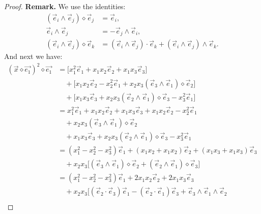 \documentclass[10pt,a4paper]{amsart}
\begin{document}
\begin{proof}
\textbf{Remark.} We use the identities:
\begin{align*}
\left( \vec{e}_{i} \wedge \vec{e}_{j} \right) \diamond \vec{e}_{j}
&= \vec{e}_{i}, \\[4pt]
\vec{e}_{i} \wedge \vec{e}_{j}
&= - \vec{e}_{j} \wedge \vec{e}_{i}, \\[4pt]
\left( \vec{e}_{i} \wedge \vec{e}_{j} \right) \diamond \vec{e}_{k}
&= \left( \vec{e}_{i} \wedge \vec{e}_{j} \right) \cdot \vec{e}_{k}
+ \left( \vec{e}_{i} \wedge \vec{e}_{j} \right) \wedge \vec{e}_{k}.
\end{align*}
And next we have:
\begin{align*}
(\vec{x}\diamond\vec{e_1})^2\diamond \vec{e_1}&= \Big[
x_{1}^{2}\vec{e}_{1}
+ x_{1}x_{2}\vec{e}_{2}
+ x_{1}x_{3}\vec{e}_{3}
\Big] \\[4pt]
&\quad + \Big[
x_{1}x_{2}\vec{e}_{2}
- x_{2}^{2}\vec{e}_{1}
+ x_{2}x_{3}\left( \vec{e}_{3}\wedge \vec{e}_{1} \right)\diamond \vec{e}_{2}
\Big] \\[4pt]
&\quad + \Big[
x_{1}x_{3}\vec{e}_{3}
+ x_{2}x_{3}\left( \vec{e}_{2}\wedge \vec{e}_{1} \right)\diamond \vec{e}_{3}
- x_{3}^{2}\vec{e}_{1}
\Big] \\[8pt]
&= x_{1}^{2}\vec{e}_{1}
+ x_{1}x_{2}\vec{e}_{2}
+ x_{1}x_{3}\vec{e}_{3}
+ x_{1}x_{2}\vec{e}_{2}
- x_{2}^{2}\vec{e}_{1} \\[4pt]
&\quad + x_{2}x_{3}\left( \vec{e}_{3}\wedge \vec{e}_{1} \right)\diamond \vec{e}_{2} \\[4pt]
&\quad + x_{1}x_{3}\vec{e}_{3}
+ x_{2}x_{3}\left( \vec{e}_{2}\wedge \vec{e}_{1} \right)\diamond \vec{e}_{3}
- x_{3}^{2}\vec{e}_{1} \\[4pt]
&= \left( x_{1}^{2}-x_{2}^{2}-x_{3}^{2} \right)\vec{e}_{1}
+ \left( x_{1}x_{2}+x_{1}x_{2} \right)\vec{e}_{2}
+ \left( x_{1}x_{3}+x_{1}x_{3} \right)\vec{e}_{3} \\[4pt]
&\quad + x_{2}x_{3}
\Big[
\left( \vec{e}_{3}\wedge \vec{e}_{1} \right)\diamond \vec{e}_{2}
+ \left( \vec{e}_{2}\wedge \vec{e}_{1} \right)\diamond \vec{e}_{3}
\Big] \\[8pt]
&= \left( x_{1}^{2}-x_{2}^{2}-x_{3}^{2} \right)\vec{e}_{1}
+ 2x_{1}x_{2}\vec{e}_{2}
+ 2x_{1}x_{3}\vec{e}_{3} \\[6pt]
&\quad + x_{2}x_{3}
\Big[
\left( \vec{e}_{2}\cdot \vec{e}_{3} \right)\vec{e}_{1}
- \left( \vec{e}_{2}\cdot \vec{e}_{1} \right)\vec{e}_{3}
+ \vec{e}_{3}\wedge \vec{e}_{1}\wedge \vec{e}_{2} \\[4pt]

\end{align*}
\end{proof}
\end{document}
